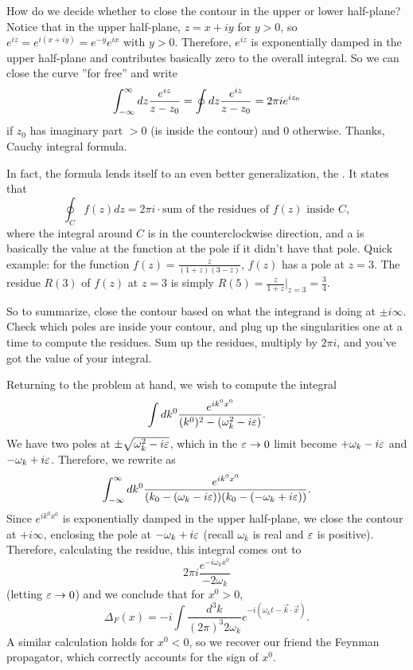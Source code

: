 How do we decide whether to close the contour in the upper or lower half-plane? Notice that in the upper half-plane, $z=x+iy$ for $y>0$, so $e^{iz}=e^{i(x+iy)}=e^{-y}e^{ix}$ with $y>0$. Therefore, $e^{iz}$ is exponentially damped in the upper half-plane and contributes basically zero to the overall integral. So we can close the curve ''for free'' and write
$$\int_{-\infty}^\infty dz \frac{e^{iz}}{z-z_0}=\oint dz \frac{e^{iz}}{z-z_0}=2\pi i e^{iz_0}$$
if $z_0$ has imaginary part $>0$ (is inside the contour) and $0$ otherwise. Thanks, Cauchy integral formula.

In fact, the formula lends itself to an even better generalization, the . It states that $$\oint_C f(z)dz = 2\pi i\cdot \text{sum of the residues of }f(z) \text{ inside } C,$$ where the integral around $C$ is in the counterclockwise direction, and a  is basically the value at the function at the pole if it didn't have that pole. Quick example: for the function $f(z)=\frac{z}{(1+z)(3-z)}$, $f(z)$ has a pole at $z=3$. The residue $R(3)$ of $f(z)$ at $z=3$ is simply $R(5)=\frac{z}{1+z}|_{z=3}=\frac{3}{4}.$

So to summarize, close the contour based on what the integrand is doing at $\pm i\infty$. Check which poles are inside your contour, and plug up the singularities one at a time to compute the residues. Sum up the residues, multiply by $2\pi i$, and you've got the value of your integral.

Returning to the problem at hand, we wish to compute the integral
$$\int dk^0 \frac{e^{i k^0 x^0}}{(k^0)^2-(\omega_k^2-i\varepsilon)}.$$ We have two poles at $\pm\sqrt{\omega_k^2-i\varepsilon}$, which in the $\varepsilon\to 0$ limit become $+\omega_k-i\varepsilon$ and $-\omega_k+i\varepsilon$. Therefore, we rewrite as
$$\int_{-\infty}^\infty dk^0 \frac{e^{i k^0 x^0}}{(k_0-(\omega_k-i\varepsilon))(k_0-(-\omega_k+i\varepsilon))}.$$
Since $e^{ik^0x^0}$ is exponentially damped in the upper half-plane, we close the contour at $+i\infty$, enclosing the pole at $-\omega_k+i\varepsilon$ (recall $\omega_k$ is real and $\varepsilon$ is positive). Therefore, calculating the residue, this integral comes out to
$$2\pi i \frac{e^{-i\omega_k x^0}}{-2\omega_k}$$
(letting $\varepsilon\to 0$) and we conclude that for $x^0>0$,
$$\Delta_F(x)=-i \int \frac{d^3 k}{(2\pi)^3 2\omega_k}e^{-i(\omega_k t- \vec{k}\cdot \vec{x})}.$$
A similar calculation holds for $x^0 < 0$, so we recover our friend the Feynman propagator, which correctly accounts for the sign of $x^0$.